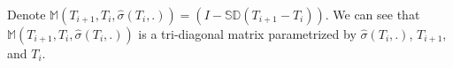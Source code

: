\documentclass[letterpaper,12pt,titlepage,oneside,final]{book}
\numberwithin{equation}{section}
\theoremstyle{definition}
\begin{document}
Denote $\mathcal{\mathbb{M}}(T_{i+1},T_{i}, \widehat{\sigma}(T_i,.))=(I-\mathcal{\mathbb{S}}\mathcal{\mathbb{D}}(T_{i+1}-T_i))$. We can see that  $\mathcal{\mathbb{M}}(T_{i+1},T_{i}, \widehat{\sigma}(T_i,.))$ is a tri-diagonal matrix parametrized by  $\widehat{\sigma}(T_i,.)$,  $T_{i+1}$,   and $T_{i}$.  


\end{document}
